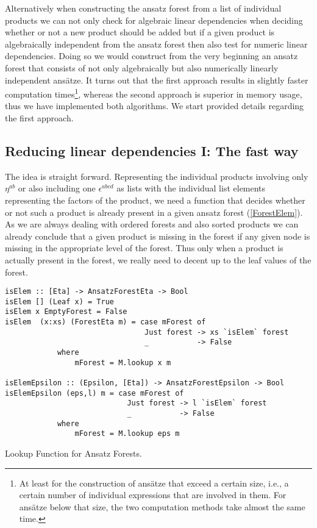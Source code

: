 Alternatively when constructing the ansatz forest from a list of individual products we can not only check for algebraic linear dependencies when deciding whether or not a new product should be added but if a given product is algebraically  independent from the ansatz forest then also test for numeric linear dependencies. Doing so we would construct from the very beginning an ansatz forest that consists of not only algebraically but also numerically linearly independent ansätze.
It turns out that the first approach results in slightly faster computation times\footnote{At least for the construction of ansätze that exceed a certain size, i.e., a certain number of individual expressions that are involved in them.
For ansätze below that size, the two computation methods take almost the same time.}, whereas the second approach is superior in memory usage, thus we have implemented both algorithms. 
We start provided details regarding the first approach. 

\subsection*{Reducing linear dependencies I:  The fast way}

The idea is straight forward. Representing the individual products involving only $\eta^{ab}$ or also including one $\epsilon^{abcd}$ as lists with the individual list elements representing the factors of the product, we need a function that decides whether or not such a product is already present in a given ansatz forest (\ref{ForestElem}). As we are always dealing with ordered forests and also sorted products we can already conclude that a given product is missing in the forest if any given node is missing in the appropriate level of the forest. Thus only when a product is actually present in the forest, we really need to decent up to the leaf values of the forest.
\begin{listing}[hbt!]
\begin{verbatim}
isElem :: [Eta] -> AnsatzForestEta -> Bool
isElem [] (Leaf x) = True
isElem x EmptyForest = False
isElem  (x:xs) (ForestEta m) = case mForest of
                                Just forest -> xs `isElem` forest
                                _           -> False
            where
                mForest = M.lookup x m

isElemEpsilon :: (Epsilon, [Eta]) -> AnsatzForestEpsilon -> Bool
isElemEpsilon (eps,l) m = case mForest of
                            Just forest -> l `isElem` forest
                            _           -> False
            where
                mForest = M.lookup eps m  
\end{verbatim} 
\caption{Lookup Function for Ansatz Forests.}\label{ForestElem}
\end{listing}

